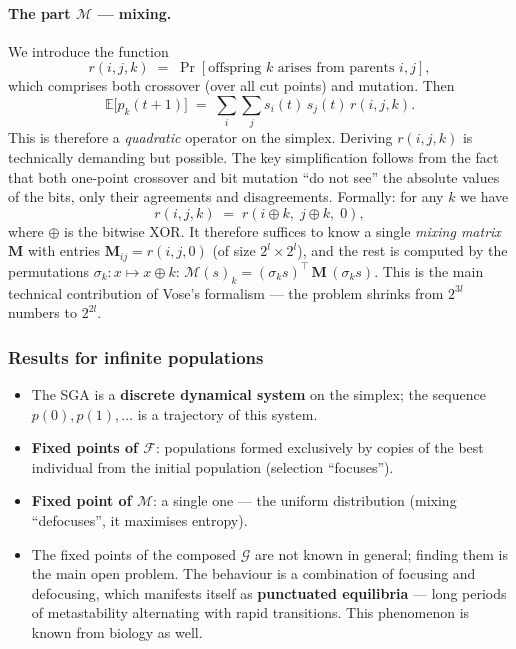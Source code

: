 \documentclass[11pt,a4paper]{article}
\theoremstyle{definition}
\providecommand{\uv}[1]{``#1''}
\begin{document}
\paragraph{The part $\mathcal{M}$ --- mixing.} We introduce the function
\[
r(i,j,k) \;=\; \Pr[\text{offspring } k \text{ arises from parents } i, j],
\]
which comprises both crossover (over all cut points) and mutation. Then
\[
\mathbb{E}\big[p_k(t+1)\big] \;=\; \sum_{i}\sum_{j} s_i(t)\, s_j(t)\, r(i,j,k).
\]
This is therefore a \emph{quadratic} operator on the simplex. Deriving
$r(i,j,k)$ is technically demanding but possible. The key simplification follows
from the fact that both one-point crossover and bit mutation \uv{do not see} the
absolute values of the bits, only their agreements and disagreements. Formally:
for any $k$ we have
\[
r(i,j,k) \;=\; r(i \oplus k,\; j \oplus k,\; 0),
\]
where $\oplus$ is the bitwise XOR. It therefore suffices to know a single
\emph{mixing matrix} $\mathbf{M}$ with entries $\mathbf{M}_{ij} = r(i,j,0)$ (of
size $2^l \times 2^l$), and the rest is computed by the permutations
$\sigma_k : x \mapsto x \oplus k$:
$\mathcal{M}(s)_k = (\sigma_k s)^{\!\top}\, \mathbf{M}\, (\sigma_k s)$.
This is the main technical contribution of Vose's formalism --- the problem
shrinks from $2^{3l}$ numbers to $2^{2l}$.

\subsubsection{Results for infinite populations}

\begin{itemize}
\item The SGA is a \textbf{discrete dynamical system} on the simplex; the
  sequence $p(0), p(1), \dots$ is a trajectory of this system.
\item \textbf{Fixed points of $\mathcal{F}$}: populations formed exclusively by
  copies of the best individual from the initial population (selection
  \uv{focuses}).
\item \textbf{Fixed point of $\mathcal{M}$}: a single one --- the uniform
  distribution (mixing \uv{defocuses}, it maximises entropy).
\item The fixed points of the composed $\mathcal{G}$ are not known in general;
  finding them is the main open problem. The behaviour is a combination of
  focusing and defocusing, which manifests itself as \textbf{punctuated
  equilibria} --- long periods of metastability alternating with rapid
  transitions. This phenomenon is known from biology as well.
\end{itemize}
\end{document}
